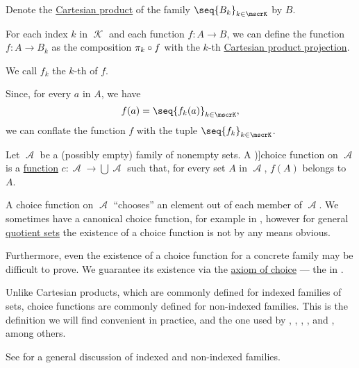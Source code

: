 \begin{definition}\label{def:projection_of_function}\mimprovised
  Denote the \hyperref[def:cartesian_product]{Cartesian product} of the family \( \seq{ B_k }_{k \in \mscrK} \) by \( B \).

  For each index \( k \) in \( \mscrK \) and each function \( f: A \to B \), we can define the function \( f: A \to B_k \) as the composition \( \pi_k \bincirc f \) with the \( k \)-th \hyperref[def:cartesian_product_projection]{Cartesian product projection}.

  We call \( f_k \) the \( k \)-th  of \( f \).
\end{definition}
\begin{comments}
  \item Since, for every \( a \) in \( A \), we have
  \begin{equation*}
    f(a) = \seq{ f_k(a) }_{k \in \mscrK},
  \end{equation*}
  we can conflate the function \( f \) with the tuple \( \seq{ f_k }_{k \in \mscrK} \).
\end{comments}

\begin{definition}\label{def:choice_function}
  Let \( \mscrA \) be a (possibly empty) family of nonempty sets. A \term[ru=функция выбора (\cite[136]{Герасимов2011Вычислимость})]{choice function} on \( \mscrA \) is a \hyperref[def:function]{function} \( c: \mscrA \to \bigcup \mscrA \) such that, for every set \( A \) in \( \mscrA \), \( f(A) \) belongs to \( A \).
\end{definition}
\begin{comments}
  \item A choice function on \( \mscrA \) \enquote{chooses} an element out of each member of \( \mscrA \). We sometimes have a canonical choice function, for example in , however for general \hyperref[def:equivalence_relation/quotient]{quotient sets} the existence of a choice function is not by any means obvious.

  \item Furthermore, even the existence of a choice function for a concrete family may be difficult to prove. We guarantee its existence via the \hyperref[def:zfc/choice]{axiom of choice} --- the  in .

  \item Unlike Cartesian products, which are commonly defined for indexed families of sets, choice functions are commonly defined for non-indexed families. This is the definition we will find convenient in practice, and the one used by
  ,
  ,
  ,
  ,
   and
  ,
  among others.

  See  for a general discussion of indexed and non-indexed families.
\end{comments}

